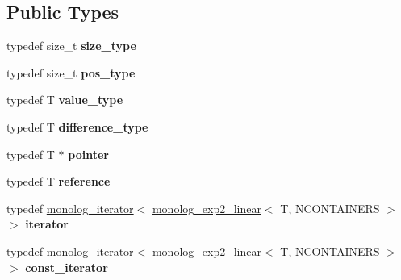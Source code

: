 \subsection*{Public Types}
\begin{DoxyCompactItemize}
\item 
\mbox{\label{classdialog_1_1monolog_1_1monolog__exp2__linear_a15166cf5aeea7f93b9a792bf414ce115}} 
typedef size\+\_\+t {\bfseries size\+\_\+type}
\item 
\mbox{\label{classdialog_1_1monolog_1_1monolog__exp2__linear_afed86e0a1005af29c645daa8d0b4479c}} 
typedef size\+\_\+t {\bfseries pos\+\_\+type}
\item 
\mbox{\label{classdialog_1_1monolog_1_1monolog__exp2__linear_a93b4f0d3a06947fff0b4a70aef0d7f2d}} 
typedef T {\bfseries value\+\_\+type}
\item 
\mbox{\label{classdialog_1_1monolog_1_1monolog__exp2__linear_acbe4c0d63df24a78bd42af4f898355fe}} 
typedef T {\bfseries difference\+\_\+type}
\item 
\mbox{\label{classdialog_1_1monolog_1_1monolog__exp2__linear_aa7d8ccbac0565677b10cbe2cdab2d4ae}} 
typedef T $\ast$ {\bfseries pointer}
\item 
\mbox{\label{classdialog_1_1monolog_1_1monolog__exp2__linear_a02bfeebfe3a8ae69fe657396abeccc66}} 
typedef T {\bfseries reference}
\item 
\mbox{\label{classdialog_1_1monolog_1_1monolog__exp2__linear_a6cc9ff2c6f3d75efaa59cdfc6acc1dab}} 
typedef \hyperlink{classdialog_1_1monolog_1_1monolog__iterator}{monolog\+\_\+iterator}$<$ \hyperlink{classdialog_1_1monolog_1_1monolog__exp2__linear}{monolog\+\_\+exp2\+\_\+linear}$<$ T, N\+C\+O\+N\+T\+A\+I\+N\+E\+RS $>$ $>$ {\bfseries iterator}
\item 
\mbox{\label{classdialog_1_1monolog_1_1monolog__exp2__linear_a2e472bb54dec91ebb9eb602a40404aed}} 
typedef \hyperlink{classdialog_1_1monolog_1_1monolog__iterator}{monolog\+\_\+iterator}$<$ \hyperlink{classdialog_1_1monolog_1_1monolog__exp2__linear}{monolog\+\_\+exp2\+\_\+linear}$<$ T, N\+C\+O\+N\+T\+A\+I\+N\+E\+RS $>$ $>$ {\bfseries const\+\_\+iterator}
\end{DoxyCompactItemize}
